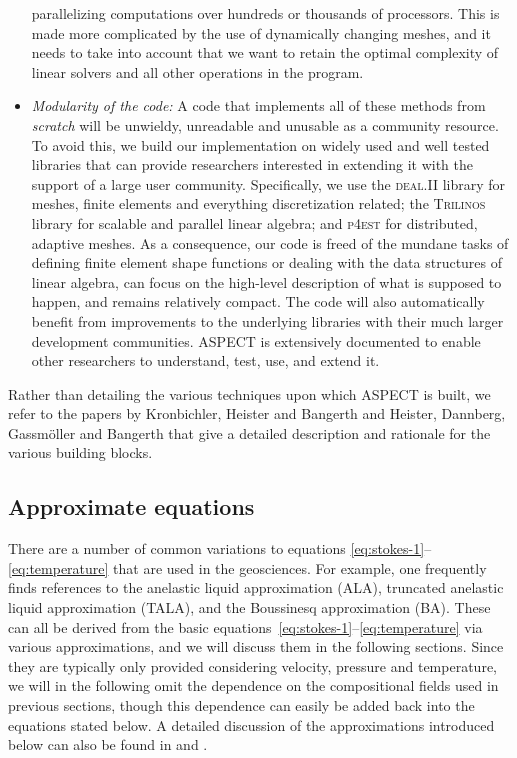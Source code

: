 \documentclass{article}
\newcommand{\dealii}{{\textsc{deal.II}}}
\newcommand{\pfrst}{{\normalfont\textsc{p4est}}}
\newcommand{\trilinos}{{\textsc{Trilinos}}}
\newcommand{\aspect}{\textsc{ASPECT}}
\begin{document}
\begin{itemize}
  parallelizing computations over hundreds or thousands of processors. This is
  made more complicated by the use of dynamically changing meshes, and it
  needs to take into account that we want to retain the optimal complexity of
  linear solvers and all other operations in the program.
\item \textit{Modularity of the code:} A code that implements all of these
  methods from \textit{scratch} will be unwieldy, unreadable and unusable as a community
  resource. To avoid this, we build our implementation on widely used and well
  tested libraries that can provide researchers interested in extending it
  with the support of a large user community. Specifically, we use the
  \dealii{} library \cite{BHK07,BK99m} for meshes, finite
  elements and everything discretization related; the \trilinos{} library
  \cite{trilinos,trilinos-web-page} for scalable and parallel linear algebra;
  and \pfrst{} \cite{p4est} for distributed, adaptive meshes. As a
  consequence, our code is freed of the mundane tasks of defining finite
  element shape functions or dealing with the data structures of linear algebra,
  can focus on the high-level description of what is supposed to happen, and
  remains relatively compact. The code will also
  automatically benefit from improvements to the underlying libraries with
  their much larger development communities. \aspect{} is extensively
  documented to enable other researchers to understand, test, use, and extend it.
\end{itemize}

Rather than detailing the various techniques upon which \aspect{} is built, we
refer to the papers by Kronbichler, Heister and Bangerth \cite{KHB12} 
and Heister, Dannberg, Gassm{\"o}ller and Bangerth \cite{heister_aspect_methods2}
that
give a detailed description and rationale for the various building blocks.


\subsection{Approximate equations}
\label{sec:approximate-equations}

There are a number of common variations to equations
\eqref{eq:stokes-1}--\eqref{eq:temperature} that are used in the
geosciences. For example, one frequently finds references to the anelastic liquid
approximation (ALA), truncated anelastic liquid approximation (TALA), and the
Boussinesq approximation (BA). These can all be derived from the basic
equations~\eqref{eq:stokes-1}--\eqref{eq:temperature} via various approximations, 
and we will discuss them in the following sections. Since they are typically only provided
considering velocity, pressure and temperature, we will in the following omit
the dependence on the compositional fields used in previous sections, though
this dependence can easily be added back into the equations stated below. A
detailed discussion of the approximations introduced below can also be found in \cite{STO01} and 
\cite{KLKLZTTK10}.
\end{document}
